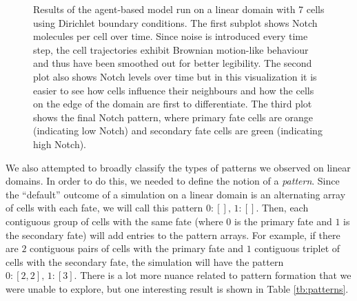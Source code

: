 \documentclass{article}
\begin{document}
\begin{figure}[!htp]
   \caption{
Results of the agent-based model run on a linear domain with 7 cells using Dirichlet boundary conditions.
The first subplot shows Notch molecules per cell over time.
Since noise is introduced every time step, the cell trajectories exhibit Brownian motion-like behaviour and thus have been smoothed out for better legibility.
The second plot also shows Notch levels over time but in this visualization it is easier to see how cells influence their neighbours and how the cells on the edge of the domain are first to differentiate.
The third plot shows the final Notch pattern, where primary fate cells are orange (indicating low Notch) and secondary fate cells are green (indicating high Notch).} 
   \label{fig:linear-domain}
\end{figure}

We also attempted to broadly classify the types of patterns we observed on linear domains.
In order to do this, we needed to define the notion of a \emph{pattern}.
Since the ``default'' outcome of a simulation on a linear domain is an alternating array of cells with each fate, we will call this pattern $0: [],\, 1: []$.
Then, each contiguous group of cells with the same fate (where $0$ is the primary fate and $1$ is the secondary fate) will add entries to the pattern arrays.
For example, if there are $2$ contiguous pairs of cells with the primary fate and $1$ contiguous triplet of cells with the secondary fate, the simulation will have the pattern $0: [2, 2], \, 1: [3]$. 
There is a lot more nuance related to pattern formation that we were unable to explore, but one interesting result is shown in Table \ref{tb:patterns}.
\end{document}
